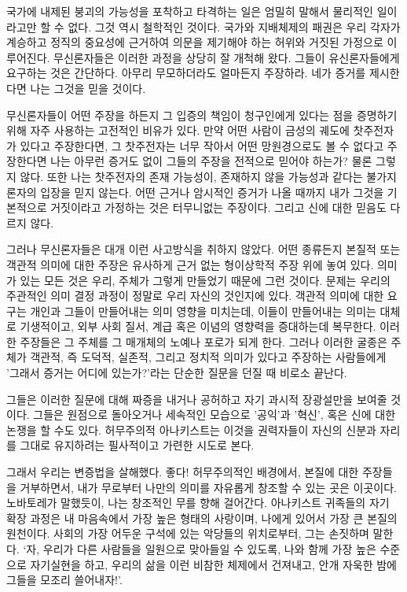 \documentclass[11pt, b6paper, openany]{memoir}
\begin{document}
\begin{article}
국가에 내제된 붕괴의 가능성을 포착하고 타격하는 일은 엄밀히 말해서 물리적인 일이라고만 할 수 없다. 그것 역시 철학적인 것이다. 국가와 지배체제의 패권은 우리 각자가 계승하고 정직의 중요성에 근거하여 의문을 제기해야 하는 허위와 거짓된 가정으로 이루어진다. 무신론자들은 이러한 과정을 상당히 잘 개척해 왔다. 그들이 유신론자들에게 요구하는 것은 간단하다. 아무리 무모하더라도 얼마든지 주장하라. 네가 증거를 제시한다면 나는 그것을 믿을 것이다. 

무신론자들이 어떤 주장을 하든지 그 입증의 책임이 청구인에게 있다는 점을 증명하기 위해 자주 사용하는 고전적인 비유가 있다. 만약 어떤 사람이 금성의 궤도에 찻주전자가 있다고 주장한다면, 그 찻주전자는 너무 작아서 어떤 망원경으로도 볼 수 없다고 주장한다면 나는 아무런 증거도 없이 그들의 주장을 전적으로 믿어야 하는가? 물론 그렇지 않다. 또한 나는 찻주전자의 존재 가능성이, 존재하지 않을 가능성과 같다는 불가지론자의 입장을 믿지 않는다. 어떤 근거나 암시적인 증거가 나올 때까지 내가 그것을 기본적으로 거짓이라고 가정하는 것은 터무니없는 주장이다. 그리고 신에 대한 믿음도 다르지 않다. 

그러나 무신론자들은 대개 이런 사고방식을 취하지 않았다. 어떤 종류든지 본질적 또는 객관적 의미에 대한 주장은 유사하게 근거 없는 형이상학적 주장 위에 놓여 있다. 의미가 있는 모든 것은 우리, 주체가 그렇게 만들었기 때문에 그런 것이다. 문제는 우리의 주관적인 의미 결정 과정이 정말로 우리 자신의 것인지에 있다. 객관적 의미에 대한 요구는 개인과 그들이 만들어내는 의미 영향을 미치는데, 이들이 만들어내는 의미는 대체로 기생적이고, 외부 사회 질서, 계급 혹은 이념의 영향력을 증대하는데 복무한다. 이러한 주장들은 그 주체를 그 매개체의 노예나 포로가 되게 한다. 그러나 이러한 굴종은 주체가 객관적, 즉 도덕적, 실존적, 그리고 정치적 의미가 있다고 주장하는 사람들에게 '그래서 증거는 어디에 있는가?'라는 단순한 질문을 던질 때 비로소 끝난다.

그들은 이러한 질문에 대해 짜증을 내거나 공허하고 자기 과시적 장광설만을 보여줄 것이다. 그들은 원점으로 돌아오거나 세속적인 모습으로 '공익'과 '혁신', 혹은 신에 대한 논쟁을 할 수도 있다. 허무주의적 아나키스트는 이것을 권력자들이 자신의 신분과 자리를 그대로 유지하려는 필사적이고 가련한 시도로 본다. 

그래서 우리는 변증법을 살해했다. 좋다! 허무주의적인 배경에서, 본질에 대한 주장들을 거부하면서, 내가 무로부터 나만의 의미를 자유롭게 창조할 수 있는 곳은 이곳이다. 노바토레가 말했듯이, 나는 창조적인 무를 향해 걸어간다. 아나키스트 귀족들의 자기 확장 과정은 내 마음속에서 가장 높은 형태의 사랑이며, 나에게 있어서 가장 큰 본질의 원천이다. 사회의 가장 어두운 구석에 있는 악당들의 위치로부터, 그는 손짓하며 말한다. ‘자, 우리가 다른 사람들을 일원으로 맞아들일 수 있도록, 나와 함께 가장 높은 수준으로 자기실현을 하고, 우리의 삶을 이런 비참한 체제에서 건져내고, 안개 자욱한 밤에 그들을 모조리 쓸어내자!’. 


\end{article}
\end{document}
